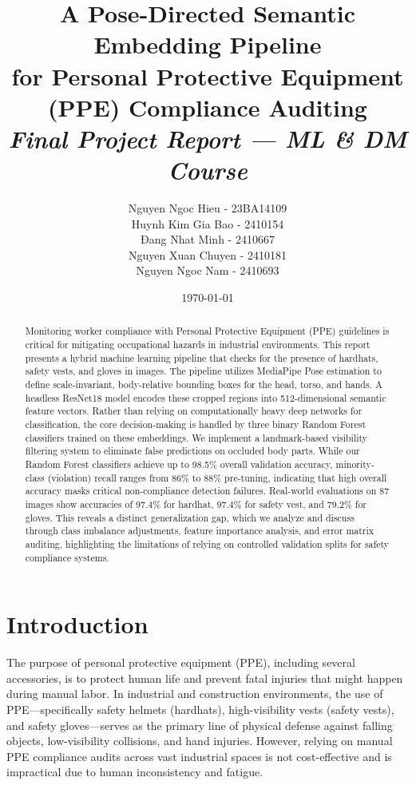 \documentclass[11pt,a4paper]{article}
\title{\LARGE\textbf{A Pose-Directed Semantic Embedding Pipeline\\for Personal Protective Equipment (PPE) Compliance Auditing}\\[0.6em]\large\textit{Final Project Report --- ML \& DM Course}}
\author{
Nguyen Ngoc Hieu - 23BA14109 \\
Huynh Kim Gia Bao - 2410154 \\
Đang Nhat Minh - 2410667 \\
Nguyen Xuan Chuyen - 2410181 \\
Nguyen Ngoc Nam - 2410693
}
\date{\today}
\begin{document}
\maketitle
\thispagestyle{plain}

\begin{abstract}
Monitoring worker compliance with Personal Protective Equipment (PPE) guidelines is critical for mitigating occupational hazards in industrial environments. This report presents a hybrid machine learning pipeline that checks for the presence of hardhats, safety vests, and gloves in images. The pipeline utilizes MediaPipe Pose estimation to define scale-invariant, body-relative bounding boxes for the head, torso, and hands. A headless ResNet18 model encodes these cropped regions into 512-dimensional semantic feature vectors. Rather than relying on computationally heavy deep networks for classification, the core decision-making is handled by three binary Random Forest classifiers trained on these embeddings. We implement a landmark-based visibility filtering system to eliminate false predictions on occluded body parts. While our Random Forest classifiers achieve up to 98.5\% overall validation accuracy, minority-class (violation) recall ranges from 86\% to 88\% pre-tuning, indicating that high overall accuracy masks critical non-compliance detection failures. Real-world evaluations on 87 images show accuracies of 97.4\% for hardhat, 97.4\% for safety vest, and 79.2\% for gloves. This reveals a distinct generalization gap, which we analyze and discuss through class imbalance adjustments, feature importance analysis, and error matrix auditing, highlighting the limitations of relying on controlled validation splits for safety compliance systems.
\end{abstract}

\newpage
\tableofcontents
\newpage
\section{Introduction}
The purpose of personal protective equipment (PPE), including several accessories, is to protect human life and prevent fatal injuries that might happen during manual labor. In industrial and construction environments, the use of PPE—specifically safety helmets (hardhats), high-visibility vests (safety vests), and safety gloves—serves as the primary line of physical defense against falling objects, low-visibility collisions, and hand injuries. However, relying on manual PPE compliance audits across vast industrial spaces is not cost-effective and is impractical due to human inconsistency and fatigue.
\end{document}
